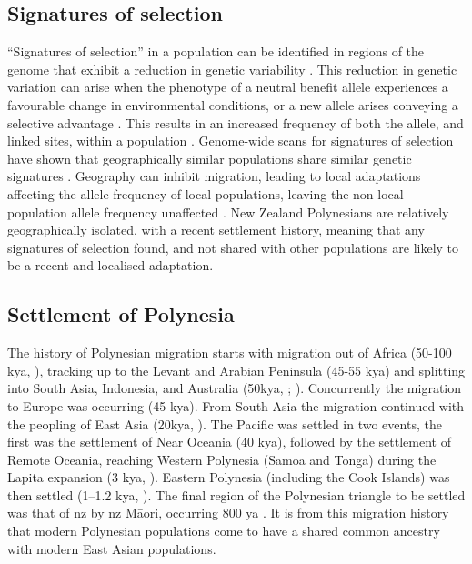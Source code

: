 \documentclass[twoside,openright]{report}
\newcommand{\tex}[1]{#1}
\begin{document}
\subsection{Signatures of selection}\label{signatures-of-selection}

``Signatures of selection'' in a population can be identified in regions
of the genome that exhibit a reduction in genetic variability
\citep{Smith1974, Kaplan1989, McVean2007}. This reduction in genetic
variation can arise when the phenotype of a neutral benefit allele
experiences a favourable change in environmental conditions, or a new
allele arises conveying a selective advantage \citep{Hermisson2005}.
This results in an increased frequency of both the allele, and linked
sites, within a population \citep{Smith1974}. Genome-wide scans for
signatures of selection have shown that geographically similar
populations share similar genetic signatures
\citep{Coop2009, pickrell2009signals}. Geography can inhibit migration,
leading to local adaptations affecting the allele frequency of local
populations, leaving the non-local population allele frequency
unaffected \citep{Coop2009}. New Zealand Polynesians are relatively
geographically isolated, with a recent settlement history, meaning that
any signatures of selection found, and not shared with other populations
are likely to be a recent and localised adaptation.

\subsection{Settlement of Polynesia}\label{settlement-of-polynesia-1}

The history of Polynesian migration starts with migration out of Africa
(50-100 kya, \citet{Nielsen2017}), tracking up to the Levant and Arabian
Peninsula (45-55 kya) and splitting into South Asia, Indonesia, and
Australia (50kya, \citet{Kivisild1999}; \citet{Quintana-Murci1999}).
Concurrently the migration to Europe was occurring (45 kya). From South
Asia the migration continued with the peopling of East Asia (20kya,
\citet{Groucutt2015}). The Pacific was settled in two events, the first
was the settlement of Near Oceania (40 kya), followed by the settlement
of Remote Oceania, reaching Western Polynesia (Samoa and Tonga) during
the Lapita expansion (3 kya, \citep{Matisoo-Smith2015,Skoglund2016}). Eastern Polynesia (including the Cook Islands)
was then settled (1--1.2 kya, \citet{Wilmshurst2011}). The final region
of the Polynesian triangle to be settled was that of \gls{nz} by
\gls{nz} M\tex{\={a}}ori, occurring 800 ya
\citep{Duggan2014, Matisoo-Smith2015}. It is from this migration history
that modern Polynesian populations come to have a shared common ancestry
with modern East Asian populations.
\end{document}
